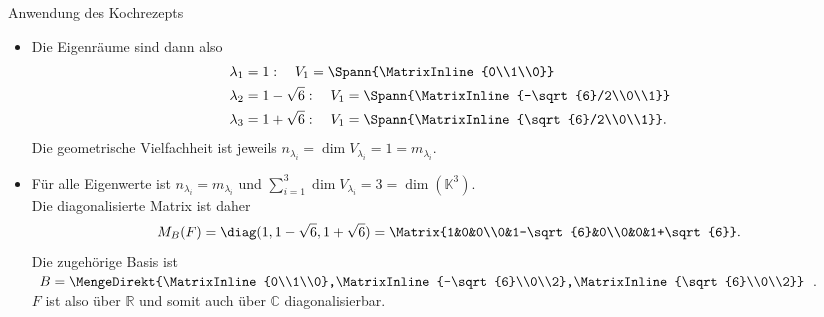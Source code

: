 \begin{Beispiel}{Anwendung des Kochrezepts}
\begin{enumerate}
\begin{itemize}
        \item Die Eigenräume sind dann also
        \begin{align*}
            \lambda_1&=1:\quad V_1=\Spann{\MatrixInline{0\\1\\0}}\\
            \lambda_2&=1-\sqrt{6}:\quad V_1=\Spann{\MatrixInline{-\sqrt{6}/2\\0\\1}}\\
            \lambda_3&=1+\sqrt{6}:\quad V_1=\Spann{\MatrixInline{\sqrt{6}/2\\0\\1}}.
        \end{align*}
        Die geometrische Vielfachheit ist jeweils $n_{\lambda_i}=\dim V_{\lambda_i}=1=m_{\lambda_i}$.
        \item Für alle Eigenwerte ist $n_{\lambda_i}=m_{\lambda_i}$ und $\sum_{i=1}^3\dim V_{\lambda_i}=3=\dim(\mathbb{K}^3)$.\\
        Die diagonalisierte Matrix ist daher
        \begin{equation*}
            M_B(F)=\diag(1,1-\sqrt{6},1+\sqrt{6})=\Matrix{1&0&0\\0&1-\sqrt{6}&0\\0&0&1+\sqrt{6}}.
        \end{equation*}
        Die zugehörige Basis ist $B=\MengeDirekt{\MatrixInline{0\\1\\0},\MatrixInline{-\sqrt{6}\\0\\2},\MatrixInline{\sqrt{6}\\0\\2}}$.\\
        $F$ ist also über $\mathbb{R}$ und somit auch über $\mathbb{C}$ diagonalisierbar.
    \end{itemize}
\end{enumerate}
\end{Beispiel}
